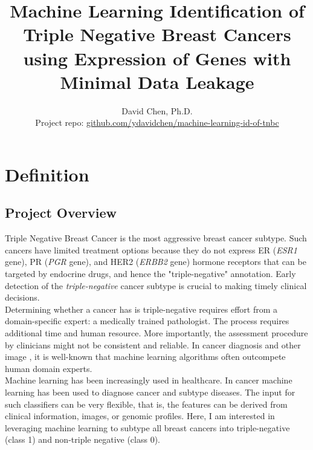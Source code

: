 \documentclass[11pt]{diazessay}
\title{\Large \textbf{Machine Learning Identification of Triple Negative Breast Cancers using Expression of Genes with Minimal Data Leakage}}
\author{David Chen, Ph.D. \\ Project repo: \url{github.com/ydavidchen/machine-learning-id-of-tnbc}}
\begin{document}
\maketitle



\section{Definition}

\subsection{Project Overview}

Triple Negative Breast Cancer is the most aggressive breast cancer subtype. Such cancers have limited treatment options because they do not express ER (\textit{ESR1} gene), PR (\textit{PGR} gene), and HER2 (\textit{ERBB2} gene) hormone receptors that can be targeted by endocrine drugs, and hence the "triple-negative" annotation. Early detection of the \textit{triple-negative} cancer subtype is crucial to making timely clinical decisions. \\

Determining whether a cancer has is triple-negative requires effort from a domain-specific expert: a medically trained pathologist. The process requires additional time and human resource. More importantly, the assessment procedure by clinicians might not be consistent and reliable. In cancer diagnosis and other image , it is well-known that machine learning algorithms often outcompete human domain experts. \\

Machine learning has been increasingly used in healthcare. In cancer machine learning has been used to diagnose cancer and subtype diseases. The input for such classifiers can be very flexible, that is, the features can be derived from clinical information, images, or genomic profiles. Here, I am interested in leveraging machine learning to subtype all breast cancers into triple-negative (class 1) and non-triple negative (class 0). \\
\end{document}
